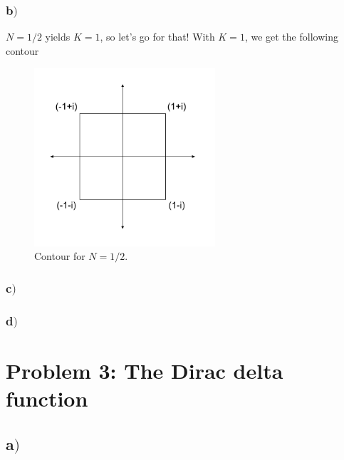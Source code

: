 \documentclass{article}
\begin{document}
\subsubsection*{b$)$}
$N = 1/2$ yields $K = 1$, so let's go for that! With $K = 1$, we get the following contour
\begin{figure}[H]
\centering
\includegraphics[width=0.6\textwidth]{complex_contour}
\caption{Contour for $N=1/2$.}
\label{fig:figure_label}
\end{figure}




\subsubsection*{c$)$}

\subsubsection*{d$)$}

\section*{Problem 3: The Dirac delta function}

\subsection*{a$)$}

\end{document}
